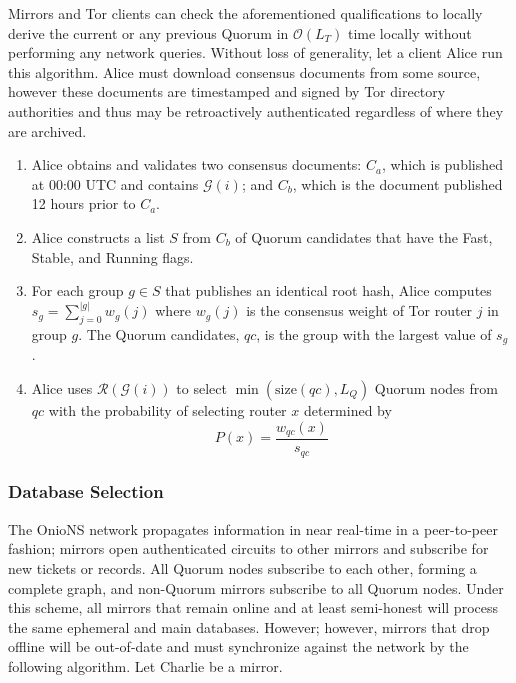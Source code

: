 \documentclass[USenglish,oneside,twocolumn]{article}
\begin{document}
Mirrors and Tor clients can check the aforementioned qualifications to locally derive the current or any previous Quorum in $ \mathcal{O}(L_{T}) $ time locally without performing any network queries. Without loss of generality, let a client Alice run this algorithm. Alice must download consensus documents from some source, however these documents are timestamped and signed by Tor directory authorities and thus may be retroactively authenticated regardless of where they are archived.

\begin{enumerate}
	\item Alice obtains and validates two consensus documents: $ C_{a} $, which is published at 00:00 UTC and contains $ \mathcal{G}(i) $; and $ C_{b} $, which is the document published 12 hours prior to $ C_{a} $. 
	\item Alice constructs a list $ S $ from $ C_{b} $ of Quorum candidates that have the Fast, Stable, and Running flags.
	\item For each group $ g \in S $ that publishes an identical root hash, Alice computes $ s_{g} = \sum_{j=0}^{\left\vert{g}\right\vert} w_{g}(j) $ where $ w_{g}(j) $ is the consensus weight of Tor router $ j $ in group $ g $. The Quorum candidates, $ \mathit{qc} $, is the group with the largest value of $ s_{g} $.
	\item Alice uses $ \mathcal{R}(\mathcal{G}(i)) $ to select $ \min(\mathrm{size}(\mathit{qc}), L_{Q}) $ Quorum nodes from $ \mathit{qc} $ with the probability of selecting router $ x $ determined by 
	\[
			P(x) = \frac{w_{\mathit{qc}}(x)}{s_{\mathit{qc}}}
	\]
\end{enumerate}

\subsubsection{Database Selection}

The OnioNS network propagates information in near real-time in a peer-to-peer fashion; mirrors open authenticated circuits to other mirrors and subscribe for new tickets or records. All Quorum nodes subscribe to each other, forming a complete graph, and non-Quorum mirrors subscribe to all Quorum nodes. Under this scheme, all mirrors that remain online and at least semi-honest will process the same ephemeral and main databases. However; however, mirrors that drop offline will be out-of-date and must synchronize against the network by the following algorithm. Let Charlie be a mirror.
\end{document}

